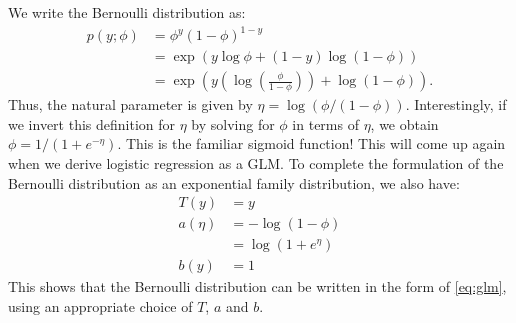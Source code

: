 We write the Bernoulli distribution as:
\begin{align}
    p(y;\phi) &= \phi^y (1 - \phi)^{1-y}\\
              &= \exp(y \log\phi + (1 - y)\log(1 - \phi))\\
              &= \exp\left( y\left( \log\left(\frac{\phi}{1-\phi}\right)\right) + \log(1-\phi)\right).
\end{align}
Thus, the natural parameter is given by $\eta = \log(\phi/(1 - \phi))$. Interestingly, if
we invert this definition for $\eta$ by solving for $\phi$ in terms of $\eta$, we obtain $\phi =
1/(1 + e^{-\eta})$. This is the familiar sigmoid function! This will come up again
when we derive logistic regression as a GLM. To complete the formulation
of the Bernoulli distribution as an exponential family distribution, we also
have:
\begin{align*}
    T(y) &= y\\
    a(\eta) &= -\log(1 - \phi)\\
            &= \log(1 + e^{\eta})\\
    b(y) &= 1    
\end{align*}
This shows that the Bernoulli distribution can be written in the form of
\ref{eq:glm}, using an appropriate choice of $T$, $a$ and $b$.

